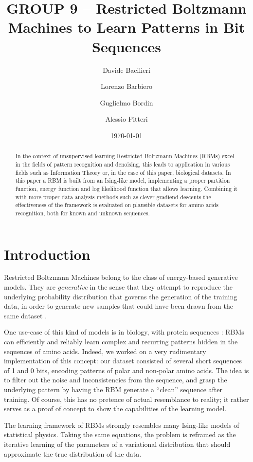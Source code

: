 \documentclass[prl, twocolumn]{revtex4-2}
\begin{document}
\title{GROUP 9 -- Restricted Boltzmann Machines to Learn Patterns in Bit Sequences}
\author{Davide Bacilieri}
\author{Lorenzo Barbiero}
\author{Guglielmo Bordin}
\author{Alessio Pitteri}
\date{\today}

\begin{abstract}
In the context of unsupervised learning Restricted Boltzmann Machines (RBMs) excel in the fields of pattern recognition and denoising, this leads to application in various fields such as Information Theory or, in the case of this paper, biological datasets.
In this paper a RBM is built from an Ising-like model, implementing a proper partition function, energy function and log likelihood function that allows learning. Combining it with more proper data analysis methods such as clever gradiend descents the effectiveness of the framework is evaluated on plausible datasets for amino acids recognition, both for known and unknown sequences.
\end{abstract}

\maketitle

\section{Introduction}
Restricted Boltzmann Machines belong to the class of energy-based generative models. They 
are \emph{generative} in the sense that they attempt to reproduce the underlying probability distribution that governs the generation of the training data, in order to generate new samples that could have been drawn from the same dataset \cite{Mehta2019}.

One use-case of this kind of models is in biology, with protein sequences \cite{Tubiana2019, Tubiana2019_b}: RBMs can efficiently and reliably learn complex and recurring patterns hidden in the sequences of amino acids. Indeed, we worked on a very rudimentary implementation of this concept: our dataset consisted of several short sequences of 1 and 0 bits, encoding patterns of polar and non-polar amino acids. The idea is to filter out the noise and inconsistencies from the sequence, and grasp the underlying pattern by having the RBM generate a “clean” sequence after training. Of course, this has no pretence of actual resemblance to reality; it rather serves as a proof of concept to show the capabilities of the learning model.

The learning framework of RBMs strongly resembles many Ising-like models of statistical physics. Taking the same equations, the problem is reframed as the iterative learning of the parameters of a variational distribution that should approximate the true distribution of the data.
\end{document}
